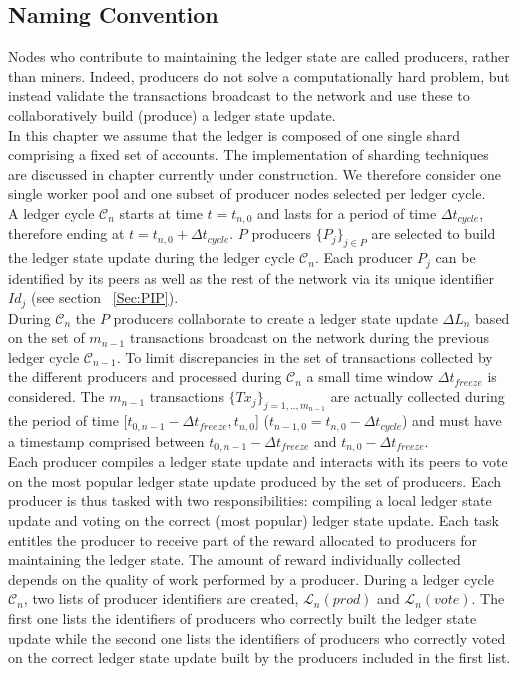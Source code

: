 \subsection{Naming Convention}

Nodes who contribute to maintaining the ledger state are called producers, rather than miners. Indeed, producers do not solve a computationally hard problem, but instead validate the transactions broadcast to the network and use these to collaboratively build (produce) a ledger state update. \\

In this chapter we assume that the ledger is composed of one single shard comprising a fixed set of accounts. The implementation of sharding techniques are discussed in chapter currently under construction.
We therefore consider one single worker pool and one subset of producer nodes selected per ledger cycle. \\

A ledger cycle $\mathcal{C}_n$ starts at time $t = t_{n,0}$ and lasts for a period of time $\Delta t_{cycle}$, therefore ending at $t = t_{n,0}+ \Delta t_{cycle}$. $P$ producers $\{P_j\}_{j\in P}$ are selected to build the ledger state update during the ledger cycle $\mathcal{C}_n$. Each producer $P_j$ can be identified by its peers as well as the rest of the network via its unique identifier $Id_j$ (see section ~\ref{Sec:PIP}).\\

During $\mathcal{C}_n$ the $P$ producers collaborate to create a ledger state update $\Delta L_{n}$ based on the set of $m_{n-1}$ transactions broadcast on the network during the previous ledger cycle $\mathcal{C}_{n-1}$. To limit discrepancies in the set of transactions collected by the different producers and processed during $\mathcal{C}_n$ a small time window $\Delta t_{freeze}$ is considered. The $m_{n-1}$ transactions $\{Tx_j\}_{j=1,..,m_{n-1}}$ are actually collected during the period of time [$t_{0,n-1} - \Delta t_{freeze}, t_{n,0}$] ($t_{n-1,0} = t_{n,0} - \Delta t_{cycle}$) and must have a timestamp comprised between $t_{0,n-1} - \Delta t_{freeze}$ and $t_{n,0} - \Delta t_{freeze}$.\\

Each producer compiles a ledger state update and interacts with its peers to vote on the most popular ledger state update produced by the set of producers. Each producer is thus tasked with two responsibilities: compiling a local ledger state update and voting on the correct (most popular) ledger state update. Each task entitles the producer to receive part of the reward allocated to producers for maintaining the ledger state. The amount of reward individually collected depends on the quality of work performed by a producer. During a ledger cycle $\mathcal{C}_n$, two lists of producer identifiers are created, $\mathcal{L}_n(prod)$ and $\mathcal{L}_n(vote)$. The first one lists the identifiers of producers who correctly built the ledger state update while the second one lists the identifiers of producers who correctly voted on the correct ledger state update built by the producers included in the first list.\\


